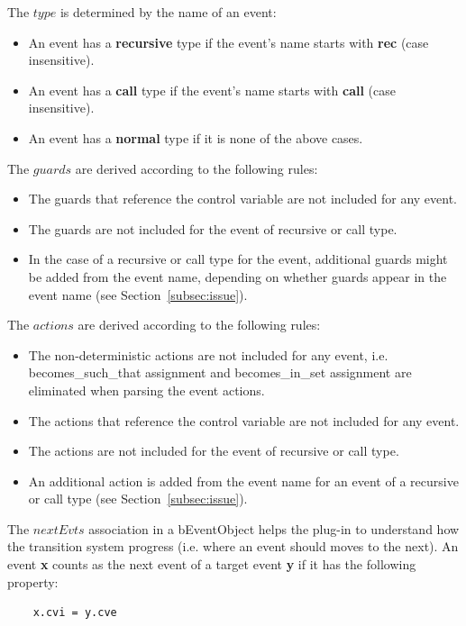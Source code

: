 \documentclass{easychair}
\begin{document}
The $type$ is determined by the name of an event:
\begin{itemize}
	\item An event has a \textbf{recursive} type if the event's name starts with \textbf{rec} (case insensitive).
	\item An event has a \textbf{call} type if the event's name starts with \textbf{call} (case insensitive).
	\item An event has a \textbf{normal} type if it is none of the above cases.
\end{itemize}

The $guards$ are derived according to the following rules:
\begin{itemize}
	\item The guards that reference the control variable are not included for any event.
	\item The guards are not included for the event of recursive or call type.
	\item In the case of a recursive or call type for the event, additional guards might be added from the event name, depending on whether guards appear in the event name (see Section~\ref{subsec:issue}).  
\end{itemize}

The $actions$ are derived according to the following rules:
\begin{itemize}
	\item The non-deterministic actions are not included for any event, i.e. becomes\_such\_that assignment and becomes\_in\_set assignment are eliminated when parsing the event actions.
	\item The actions that reference the control variable are not included for any event.
	\item The actions are not included for the event of recursive or call type.
	\item An additional action is added from the event name for an event of a recursive or call type (see Section~\ref{subsec:issue}).  
\end{itemize}

The $nextEvts$ association in a bEventObject helps the plug-in to understand how the transition system progress (i.e. where an event should moves to the next). An event \textbf{x} counts as the next event of a target event \textbf{y} if it has the following property:
\begin{lstlisting}
	x.cvi = y.cve
\end{lstlisting}
\end{document}
